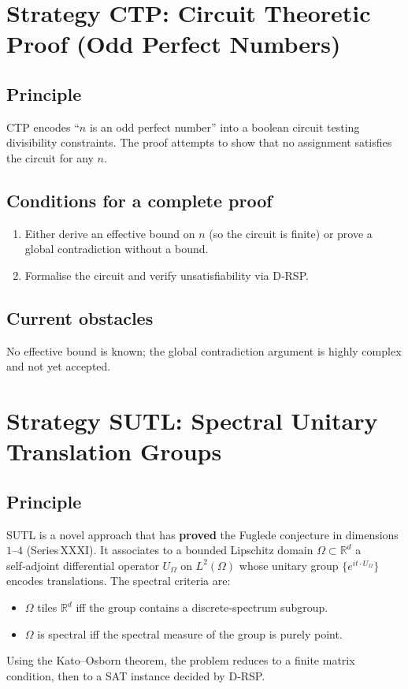 \documentclass[11pt,a4paper]{article}
\begin{document}
\section{Strategy CTP: Circuit Theoretic Proof (Odd Perfect Numbers)}

\subsection{Principle}
CTP encodes “\(n\) is an odd perfect number” into a boolean circuit testing divisibility constraints. The proof attempts to show that no assignment satisfies the circuit for any \(n\).

\subsection{Conditions for a complete proof}
\begin{enumerate}
\item Either derive an effective bound on \(n\) (so the circuit is finite) or prove a global contradiction without a bound.
\item Formalise the circuit and verify unsatisfiability via D‑RSP.
\end{enumerate}

\subsection{Current obstacles}
No effective bound is known; the global contradiction argument is highly complex and not yet accepted.

\section{Strategy SUTL: Spectral Unitary Translation Groups}

\subsection{Principle}
SUTL is a novel approach that has \textbf{proved} the Fuglede conjecture in dimensions \(1\)–\(4\) (Series XXXI). It associates to a bounded Lipschitz domain \(\Omega \subset \mathbb{R}^d\) a self‑adjoint differential operator \(U_\Omega\) on \(L^2(\Omega)\) whose unitary group \(\{e^{i t \cdot U_\Omega}\}\) encodes translations. The spectral criteria are:
\begin{itemize}
\item \(\Omega\) tiles \(\mathbb{R}^d\) iff the group contains a discrete‑spectrum subgroup.
\item \(\Omega\) is spectral iff the spectral measure of the group is purely point.
\end{itemize}
Using the Kato–Osborn theorem, the problem reduces to a finite matrix condition, then to a SAT instance decided by D‑RSP.
\end{document}
